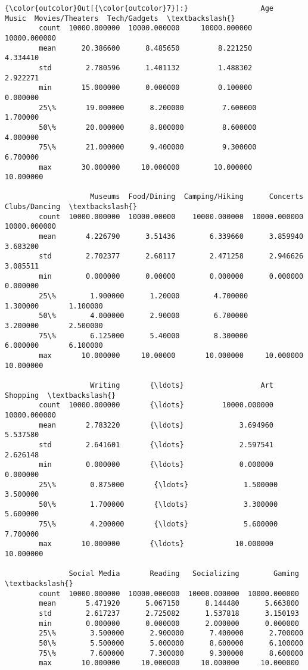 \documentclass[11pt]{article}
\begin{document}
\begin{Verbatim}[commandchars=\\\{\}]
{\color{outcolor}Out[{\color{outcolor}7}]:}                 Age         Music  Movies/Theaters  Tech/Gadgets  \textbackslash{}
        count  10000.000000  10000.000000     10000.000000  10000.000000   
        mean      20.386600      8.485650         8.221250      4.334410   
        std        2.780596      1.401132         1.488302      2.922271   
        min       15.000000      0.000000         0.100000      0.000000   
        25\%       19.000000      8.200000         7.600000      1.700000   
        50\%       20.000000      8.800000         8.600000      4.000000   
        75\%       21.000000      9.400000         9.300000      6.700000   
        max       30.000000     10.000000        10.000000     10.000000   
        
                    Museums  Food/Dining  Camping/Hiking      Concerts  Clubs/Dancing  \textbackslash{}
        count  10000.000000  10000.00000    10000.000000  10000.000000   10000.000000   
        mean       4.226790      3.51436        6.339660      3.859940       3.683200   
        std        2.702377      2.68117        2.471258      2.946626       3.085511   
        min        0.000000      0.00000        0.000000      0.000000       0.000000   
        25\%        1.900000      1.20000        4.700000      1.300000       1.100000   
        50\%        4.000000      2.90000        6.700000      3.200000       2.500000   
        75\%        6.125000      5.40000        8.300000      6.000000       6.100000   
        max       10.000000     10.00000       10.000000     10.000000      10.000000   
        
                    Writing       {\ldots}                  Art      Shopping  \textbackslash{}
        count  10000.000000       {\ldots}         10000.000000  10000.000000   
        mean       2.783220       {\ldots}             3.694960      5.537580   
        std        2.641601       {\ldots}             2.597541      2.626148   
        min        0.000000       {\ldots}             0.000000      0.000000   
        25\%        0.875000       {\ldots}             1.500000      3.500000   
        50\%        1.700000       {\ldots}             3.300000      5.600000   
        75\%        4.200000       {\ldots}             5.600000      7.700000   
        max       10.000000       {\ldots}            10.000000     10.000000   
        
               Social Media       Reading   Socializing        Gaming  \textbackslash{}
        count  10000.000000  10000.000000  10000.000000  10000.000000   
        mean       5.471920      5.067150      8.144480      5.663800   
        std        2.617237      2.725082      1.537818      3.150193   
        min        0.000000      0.000000      2.000000      0.000000   
        25\%        3.500000      2.900000      7.400000      2.700000   
        50\%        5.500000      5.000000      8.600000      6.100000   
        75\%        7.600000      7.300000      9.300000      8.600000   
        max       10.000000     10.000000     10.000000     10.000000   
        

\end{Verbatim}
\end{document}
